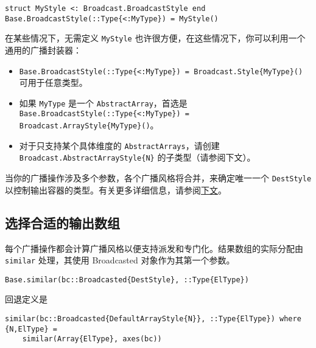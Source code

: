 \begin{verbatim}
struct MyStyle <: Broadcast.BroadcastStyle end
Base.BroadcastStyle(::Type{<:MyType}) = MyStyle()
\end{verbatim}



在某些情况下，无需定义 \texttt{MyStyle} 也许很方便，在这些情况下，你可以利用一个通用的广播封装器：



\begin{itemize}
\item \texttt{Base.BroadcastStyle(::Type\{<:MyType\}) = Broadcast.Style\{MyType\}()} 可用于任意类型。


\item 如果 \texttt{MyType} 是一个 \texttt{AbstractArray}，首选是 \texttt{Base.BroadcastStyle(::Type\{<:MyType\}) = Broadcast.ArrayStyle\{MyType\}()}。


\item 对于只支持某个具体维度的 \texttt{AbstractArrays}，请创建 \texttt{Broadcast.AbstractArrayStyle\{N\}} 的子类型（请参阅下文）。

\end{itemize}


当你的广播操作涉及多个参数，各个广播风格将合并，来确定唯一一个 \texttt{DestStyle} 以控制输出容器的类型。有关更多详细信息，请参阅\hyperlink{17567878480973592299}{下文}。



\hypertarget{4710253435053989143}{}


\subsection{选择合适的输出数组}



每个广播操作都会计算广播风格以便支持派发和专门化。结果数组的实际分配由 \texttt{similar} 处理，其使用 Broadcasted 对象作为其第一个参数。




\begin{verbatim}
Base.similar(bc::Broadcasted{DestStyle}, ::Type{ElType})
\end{verbatim}



回退定义是




\begin{verbatim}
similar(bc::Broadcasted{DefaultArrayStyle{N}}, ::Type{ElType}) where {N,ElType} =
    similar(Array{ElType}, axes(bc))
\end{verbatim}



